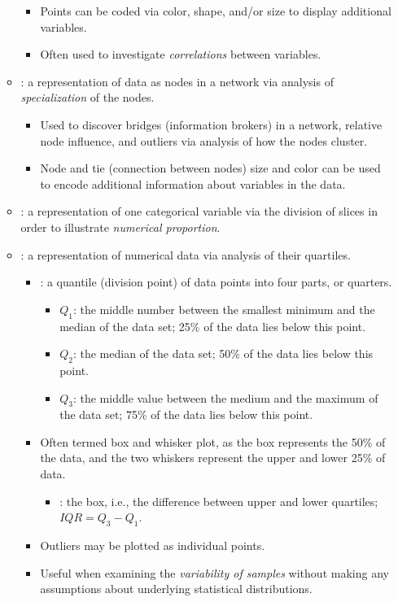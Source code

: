\begin{itemize}
\begin{itemize}
      \begin{itemize}
        \item Points can be coded via color, shape, and/or size to display additional variables.
        \item Often used to investigate \emph{correlations} between variables.
      \end{itemize}
    \item {}: a representation of data as nodes in a network via analysis of \emph{specialization} of the nodes.
      \begin{itemize}
        \item Used to discover bridges (information brokers) in a network, relative node influence, and outliers via analysis of how the nodes cluster.
        \item Node and tie (connection between nodes) size and color can be used to encode additional information about variables in the data.
      \end{itemize}
    \item {}: a representation of one categorical variable via the division of slices in order to illustrate \emph{numerical proportion}.
    \label{boxplot}
    \item {}: a representation of numerical data via analysis of their quartiles.
      \begin{itemize}
        \item {}: a quantile (division point) of data points into four parts, or quarters. 
          \begin{itemize}
            \item \(Q_1\): the middle number between the smallest minimum and the median of the data set; 25\% of the data lies below this point.
            \item \(Q_2\): the median of the data set; 50\% of the data lies below this point.
            \item \(Q_3\): the middle value between the medium and the maximum of the data set; 75\% of the data lies below this point.
          \end{itemize}
        \item Often termed box and whisker plot, as the box represents the 50\% of the data, and the two whiskers represent the upper and lower 25\% of data.
          \begin{itemize}
            \item {}: the box, i.e., the difference between upper and lower quartiles; \(IQR = Q_3-Q_1\).
          \end{itemize}
        \item Outliers may be plotted as individual points.
        \item Useful when examining the \emph{variability of samples} without making any assumptions about underlying statistical distributions.
      \end{itemize}
  \end{itemize}
  
\end{itemize}